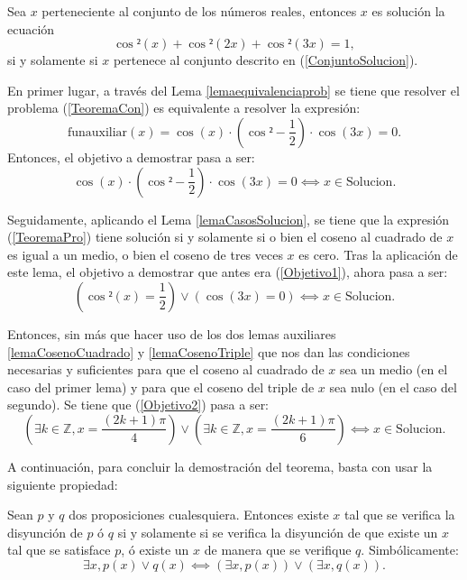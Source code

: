 \begin{teorema}
  Sea \(x\) perteneciente al conjunto de los números reales,
  entonces \(x\) es solución la ecuación
  \begin{equation}\label{TeoremaCon}
    \cos²(x)+\cos²(2x)+\cos²(3x)=1,
  \end{equation}
  si y solamente si \(x\) pertenece al conjunto descrito en
  (\ref{ConjuntoSolucion}).
\end{teorema}
\begin{demostracion}
  En primer lugar, a través del Lema \ref{lemaequivalenciaprob}
  se tiene que resolver el problema (\ref{TeoremaCon}) es
  equivalente a resolver la expresión:
  \begin{equation}\label{TeoremaPro}
    \text{funauxiliar}(x)=\cos(x)·(\cos²-\frac{1}{2})·\cos(3x)=0.
  \end{equation}
  Entonces, el objetivo a demostrar pasa a ser:
  \begin{equation}\label{Objetivo1}
    \cos(x)·(\cos²-\frac{1}{2})·\cos(3x)=0 ⟺ x∈ \text{Solucion}.
  \end{equation}

  Seguidamente, aplicando el Lema \ref{lemaCasosSolucion},
  se tiene que la expresión (\ref{TeoremaPro}) tiene solución
  si y solamente si o bien el coseno al cuadrado de \(x\) es
  igual a un medio, o bien el coseno de tres veces \(x\) es cero.
  Tras la aplicación de este lema, el objetivo a demostrar
  que antes era (\ref{Objetivo1}), ahora pasa a ser:
  \begin{equation}\label{Objetivo2}
   (\cos²(x)=\frac{1}{2})\lor (\cos(3x)=0) ⟺ x∈ \text{Solucion}.
  \end{equation}
  
  Entonces, sin más que hacer uso de los dos lemas auxiliares
  \ref{lemaCosenoCuadrado} y \ref{lemaCosenoTriple}
  que nos dan las condiciones necesarias y suficientes
  para que el coseno al cuadrado de \(x\) sea un medio (en el caso
  del primer lema) y para que el coseno del triple de \(x\) sea
  nulo (en el caso del segundo). Se tiene que (\ref{Objetivo2})
  pasa a ser:
  \begin{equation}
    (∃k∈ℤ, x=\frac{(2k+1)π}{4}) \lor (∃k∈ℤ, x=\frac{(2k+1)π}{6})
    ⟺ x∈ \text{Solucion}.
  \end{equation}

  A continuación, para concluir la demostración del teorema, basta
  con usar la siguiente propiedad:
  \begin{teorema}\label{distri}
    Sean \(p\) y \(q\) dos proposiciones cualesquiera. Entonces
    existe \(x\) tal que se verifica la disyunción de \(p\) ó \(q\)
    si y solamente si se verifica la disyunción de que existe un
    \(x\) tal que se satisface \(p\), ó existe un \(x\) de manera
    que se verifique \(q\). Simbólicamente:
    \begin{equation}
      ∃x, p(x) \lor q(x) ⟺(∃x, p(x))\lor(∃x, q(x)).
    \end{equation}
  \end{teorema}


\end{demostracion}
